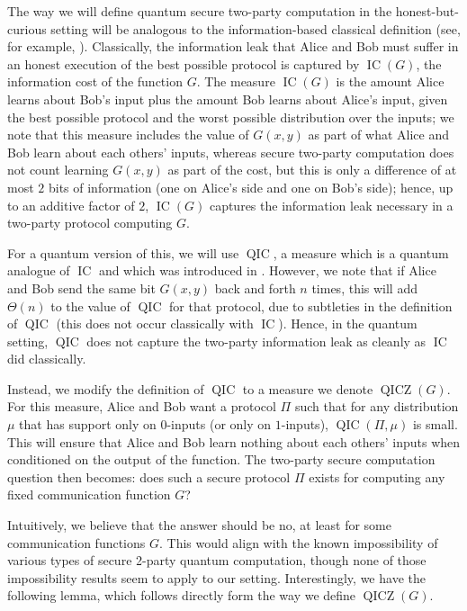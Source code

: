 \documentclass[10pt,a4paper]{article}
\theoremstyle{definition}
\renewcommand{\>}{\rangle}
\newcommand{\<}{\langle}
\DeclareMathOperator{\QICZ}{QICZ}
\DeclareMathOperator{\IC}{IC}
\DeclareMathOperator{\QIC}{QIC}
\begin{document}
The way we will define quantum secure two-party computation
in the honest-but-curious setting will be analogous
to the information-based classical definition
(see, for example, \cite{BW15}). Classically,
the information leak that Alice and Bob must suffer
in an honest execution of the best possible
protocol is captured by $\IC(G)$, the information
cost of the function $G$. The measure $\IC(G)$
is the amount Alice learns about Bob's input
plus the amount Bob learns about Alice's input,
given the best possible protocol and the worst possible
distribution over the inputs; we note that this measure
includes the value of $G(x,y)$ as part of what Alice and Bob
learn about each others' inputs, whereas secure
two-party computation does not count learning $G(x,y)$
as part of the cost, but this is only a difference of at most
$2$ bits of information (one on Alice's side and one on Bob's side);
hence, up to an additive factor of $2$, $\IC(G)$
captures the information leak necessary in a two-party
protocol computing $G$.

For a quantum version of this, we will use $\QIC$,
a measure which is a quantum analogue
of $\IC$ and which was introduced in \cite{Tou15}.
However, we note that if Alice and Bob send the same bit
$G(x,y)$ back and forth $n$ times, this will add $\Theta(n)$
to the value of $\QIC$ for that protocol, due to subtleties
in the definition of $\QIC$ (this does not occur classically
with $\IC$). Hence, in the quantum setting, $\QIC$ does not
capture the two-party information leak as cleanly as $\IC$
did classically.

Instead, we modify the definition of $\QIC$ to a measure
we denote $\QICZ(G)$.
For this measure,
Alice and Bob want a protocol $\Pi$ such that for any
distribution $\mu$ that has support only on $0$-inputs
(or only on $1$-inputs), $\QIC(\Pi,\mu)$ is small.
This will ensure that Alice and Bob learn nothing
about each others' inputs when conditioned on the output
of the function. The two-party secure
computation question then becomes:
does such a secure protocol $\Pi$ exists for computing
any fixed communication function $G$?

Intuitively, we believe that the answer should be no,
at least for some communication functions $G$. This would
align with the known impossibility of various types of
secure 2-party quantum computation, though none of those
impossibility results seem to apply to our setting.
Interestingly, we have the following lemma, which
follows directly form the way we define $\QICZ(G)$.
\end{document}
